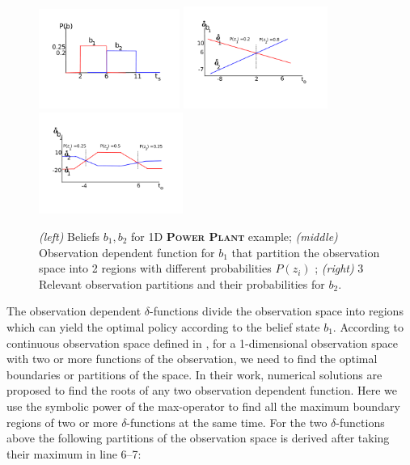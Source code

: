 \documentclass{article} %
\begin{document}
\begin{figure}[tbp!]
\vspace{-6mm}
\centering
\hspace{-17mm}
\includegraphics[width=0.41\textwidth]{pics/beliefs.pdf}
\hspace{-12mm}
\includegraphics[width=0.42\textwidth]{pics/delta1.pdf}
\hspace{-12mm}
\includegraphics[width=0.42\textwidth]{pics/delta2.pdf}
\hspace{-17mm}
\vspace{-10mm}
\caption{\footnotesize 
{\it (left)} Beliefs $b_1,b_2$ for 1D \textsc{\bf Power Plant} example; 
{\it (middle)} Observation dependent function for $b_1$ that partition the observation space into 2 regions with different probabilities $P(z_i)$ ; 
{\it (right)} 3 Relevant observation partitions and their probabilities for $b_2$.
}
\label{fig:timeSpace}
\vspace{-4mm}
\end{figure}
The observation dependent $\delta$-functions divide the observation space into regions which can yield the optimal policy according to the belief state $b_1$. According to continuous observation space defined in \cite{pascal_ijcai05}, for a 1-dimensional observation space with two or more functions of the observation, we need to find the optimal boundaries or partitions of the space. In their work, numerical solutions are proposed to find the roots of any two observation dependent function. Here we use the symbolic power of the max-operator to find all the maximum boundary regions of two or more $\delta$-functions at the same time. For the two $\delta$-functions above the following partitions of the observation space is derived after taking their maximum in line 6--7: 
\end{document}
